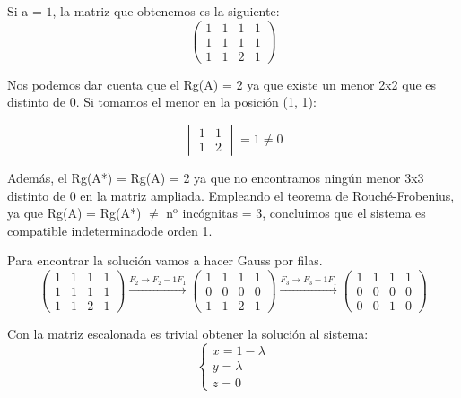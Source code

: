 \documentclass{article}
\begin{document}
Si a = $1$, la matriz que obtenemos es la siguiente:
$$
\left(\begin{array}{ccc|c}1 & 1 & 1 & 1 \\1 & 1 & 1 & 1\\1 & 1 & 2 & 1\end{array}\right)$$

Nos podemos dar cuenta que el Rg(A) = 2 ya que existe un menor 2x2 que es distinto de 0. Si tomamos el menor en la posici\'on (1, 1):

$$
\begin{vmatrix}1 & 1\\1 & 2\end{vmatrix} = 1 \neq 0$$

Adem\'as, el Rg(A*) = Rg(A) = 2 ya que no encontramos ning\'un menor 3x3 distinto de 0 en la matriz ampliada. Empleando el teorema de Rouch\'e-Frobenius, ya que Rg(A) = Rg(A*) $\neq$ n$^{\text{o}}$ inc\'ognitas = 3, concluimos que el sistema es compatible indeterminadode orden 1.

Para encontrar la soluci\'on vamos a hacer Gauss por filas. 
$$
\left(\begin{array}{ccc|c}1 & 1 & 1 & 1 \\1 & 1 & 1 & 1\\1 & 1 & 2 & 1\end{array}\right)\xrightarrow{F_2\to F_2-1F_1}\left(\begin{array}{ccc|c}1 & 1 & 1 & 1 \\0 & 0 & 0 & 0\\1 & 1 & 2 & 1\end{array}\right)\xrightarrow{F_3\to F_3-1F_1}\left(\begin{array}{ccc|c}1 & 1 & 1 & 1 \\0 & 0 & 0 & 0\\0 & 0 & 1 & 0\end{array}\right)$$
$$$$

Con la matriz escalonada es trivial obtener la soluci\'on al sistema: $$
\left\{\begin{array}{lll}x = 1 - \lambda\\ y = \lambda\\ z = 0\end{array}\right.$$\\
\end{document}
